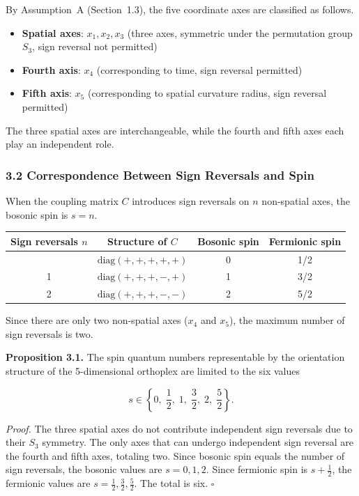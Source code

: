 \documentclass[a4paper,11pt]{article}
\providecommand{\tightlist}{\setlength{\itemsep}{0pt}\setlength{\parskip}{0pt}}
\newcounter{none}
\begin{document}
By Assumption~A (Section~1.3), the five coordinate axes are classified as follows.

\begin{itemize}
\tightlist
\item
  \textbf{Spatial axes}: $x_1, x_2, x_3$ (three axes, symmetric under the permutation group $S_3$, sign reversal not permitted)
\item
  \textbf{Fourth axis}: $x_4$ (corresponding to time, sign reversal permitted)
\item
  \textbf{Fifth axis}: $x_5$ (corresponding to spatial curvature radius, sign reversal permitted)
\end{itemize}

The three spatial axes are interchangeable, while the fourth and fifth axes each play an independent role.

\subsubsection*{3.2 Correspondence Between Sign Reversals and Spin}

When the coupling matrix $C$ introduces sign reversals on $n$ non-spatial axes, the bosonic spin is $s = n$.

{\def\LTcaptype{none}
\begin{longtable}[]{@{}cccc@{}}
\toprule
Sign reversals $n$ & Structure of $C$ & Bosonic spin & Fermionic spin \\
\midrule
\endhead
\bottomrule
\endlastfoot
0 & $\mathrm{diag}(+,+,+,+,+)$ & 0 & 1/2 \\
1 & $\mathrm{diag}(+,+,+,-,+)$ & 1 & 3/2 \\
2 & $\mathrm{diag}(+,+,+,-,-)$ & 2 & 5/2 \\
\end{longtable}
}

Since there are only two non-spatial axes ($x_4$ and $x_5$), the maximum number of sign reversals is two.

\textbf{Proposition 3.1.} The spin quantum numbers representable by the orientation structure of the 5-dimensional orthoplex are limited to the six values

\[s \in \left\{ 0, \; \frac{1}{2}, \; 1, \; \frac{3}{2}, \; 2, \; \frac{5}{2} \right\}.\]

\emph{Proof.} The three spatial axes do not contribute independent sign reversals due to their $S_3$ symmetry. The only axes that can undergo independent sign reversal are the fourth and fifth axes, totaling two. Since bosonic spin equals the number of sign reversals, the bosonic values are $s = 0, 1, 2$. Since fermionic spin is $s + \frac{1}{2}$, the fermionic values are $s = \frac{1}{2}, \frac{3}{2}, \frac{5}{2}$. The total is six. $\square$
\end{document}
